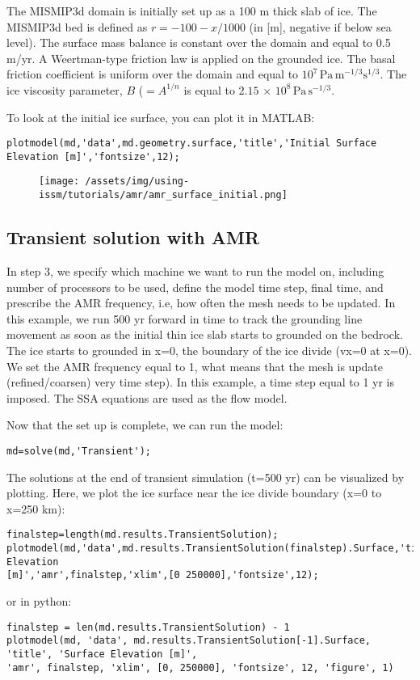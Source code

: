 The MISMIP3d domain is initially set up as a 100 m thick slab of ice. The MISMIP3d bed is defined as $r=-100-x/1000$ (in [m], negative if below sea level). The surface mass balance is constant over the domain and equal to 0.5 m/yr. A Weertman-type friction law is applied on the grounded ice. The basal friction coefficient is uniform over the domain and equal to $10^{7}\,\textrm{Pa}\,\textrm{m}^{-1/3}\textrm{s}^{1/3}$. The ice viscosity parameter, $B$ ($=A^{1/n}$ is equal to $2.15 \, \times \, 10^{8}\,\textrm{Pa}\,\textrm{s}^{-1/3}$.

To look at the initial ice surface, you can plot it in MATLAB:
\begin{verbatim}plotmodel(md,'data',md.geometry.surface,'title','Initial Surface Elevation [m]','fontsize',12);\end{verbatim}

\begin{figure}[H]
	\begin{center}
		\texttt{[image: /assets/img/using-issm/tutorials/amr/amr\_surface\_initial.png]}
	\end{center}
\end{figure}

\subsection{Transient solution with AMR}
In step 3, we specify which machine we want to run the model on, including number of processors to be used, define the model time step, final time, and prescribe the AMR frequency, i.e, how often the mesh needs to be updated. In this example, we run 500 yr forward in time to track the grounding line movement as soon as the initial thin ice slab starts to grounded on the bedrock. The ice starts to grounded in x=0, the boundary of the ice divide (vx=0 at x=0). We set the AMR frequency equal to 1, what means that the mesh is update (refined/coarsen) very time step). In this example, a time step equal to 1 yr is imposed. The SSA equations are used as the flow model.

Now that the set up is complete, we can run the model:
\begin{verbatim}md=solve(md,'Transient');\end{verbatim}

The solutions at the end of transient simulation (t=500 yr) can be visualized by plotting. Here, we plot the ice surface near the ice divide boundary (x=0 to x=250 km):
\begin{verbatim}finalstep=length(md.results.TransientSolution);
plotmodel(md,'data',md.results.TransientSolution(finalstep).Surface,'title','Surface Elevation
[m]','amr',finalstep,'xlim',[0 250000],'fontsize',12);\end{verbatim}
or in python:
\begin{verbatim}finalstep = len(md.results.TransientSolution) - 1
plotmodel(md, 'data', md.results.TransientSolution[-1].Surface, 'title', 'Surface Elevation [m]',
'amr', finalstep, 'xlim', [0, 250000], 'fontsize', 12, 'figure', 1)\end{verbatim}

